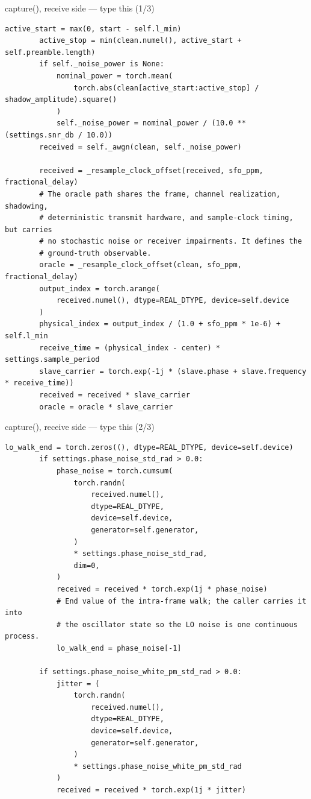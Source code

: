 \documentclass[10pt]{beamer}
\begin{document}
\begin{frame}[fragile]{capture(), receive side --- type this (1/3)}
\begin{lstlisting}[basicstyle=\ttfamily\tiny]
        active_start = max(0, start - self.l_min)
        active_stop = min(clean.numel(), active_start + self.preamble.length)
        if self._noise_power is None:
            nominal_power = torch.mean(
                torch.abs(clean[active_start:active_stop] / shadow_amplitude).square()
            )
            self._noise_power = nominal_power / (10.0 ** (settings.snr_db / 10.0))
        received = self._awgn(clean, self._noise_power)

        received = _resample_clock_offset(received, sfo_ppm, fractional_delay)
        # The oracle path shares the frame, channel realization, shadowing,
        # deterministic transmit hardware, and sample-clock timing, but carries
        # no stochastic noise or receiver impairments. It defines the
        # ground-truth observable.
        oracle = _resample_clock_offset(clean, sfo_ppm, fractional_delay)
        output_index = torch.arange(
            received.numel(), dtype=REAL_DTYPE, device=self.device
        )
        physical_index = output_index / (1.0 + sfo_ppm * 1e-6) + self.l_min
        receive_time = (physical_index - center) * settings.sample_period
        slave_carrier = torch.exp(-1j * (slave.phase + slave.frequency * receive_time))
        received = received * slave_carrier
        oracle = oracle * slave_carrier
\end{lstlisting}
\end{frame}

\begin{frame}[fragile]{capture(), receive side --- type this (2/3)}
\begin{lstlisting}[basicstyle=\ttfamily\tiny]
        lo_walk_end = torch.zeros((), dtype=REAL_DTYPE, device=self.device)
        if settings.phase_noise_std_rad > 0.0:
            phase_noise = torch.cumsum(
                torch.randn(
                    received.numel(),
                    dtype=REAL_DTYPE,
                    device=self.device,
                    generator=self.generator,
                )
                * settings.phase_noise_std_rad,
                dim=0,
            )
            received = received * torch.exp(1j * phase_noise)
            # End value of the intra-frame walk; the caller carries it into
            # the oscillator state so the LO noise is one continuous process.
            lo_walk_end = phase_noise[-1]

        if settings.phase_noise_white_pm_std_rad > 0.0:
            jitter = (
                torch.randn(
                    received.numel(),
                    dtype=REAL_DTYPE,
                    device=self.device,
                    generator=self.generator,
                )
                * settings.phase_noise_white_pm_std_rad
            )
            received = received * torch.exp(1j * jitter)
\end{lstlisting}
\end{frame}
\end{document}
